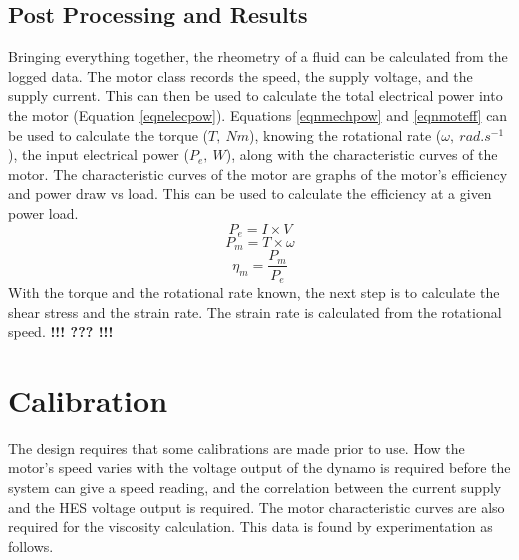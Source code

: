 \documentclass[twoside,a4]{report}
\def\cbh{\large\bfseries !!! ??? !!! \normalsize\normalfont}
\begin{document}
	\subsection*{Post Processing and Results} %
	Bringing everything together, the rheometry of a fluid can be calculated from the logged data. The motor class records the speed, the supply voltage, and the supply current. This can then be used to calculate the total electrical power into the motor (Equation \ref{eqnelecpow}). Equations \ref{eqnmechpow} and \ref{eqnmoteff} can be used to calculate the torque (\(T,\ Nm\)), knowing the rotational rate (\(\omega,\ rad.s^{-1}\)), the input electrical power (\(P_e,\ W\)), along with the characteristic curves of the motor. The characteristic curves of the motor are graphs of the motor's efficiency and power draw vs load. This can be used to calculate the efficiency at a given power load.
	\begin{equation}
		P_e = I \times V
		\label{eqnelecpow}
	\end{equation}
	\begin{equation}
		P_m = T \times \omega
		\label{eqnmechpow}
	\end{equation}
	\begin{equation}
		\eta_m = \frac{P_m}{P_e}
		\label{eqnmoteff}
	\end{equation}
	With the torque and the rotational rate known, the next step is to calculate the shear stress and the strain rate.
	The strain rate is calculated from the rotational speed. \cbh
	
	\section{Calibration} %
	The design requires that some calibrations are made prior to use. How the motor's speed varies with the voltage output of the dynamo is required before the system can give a speed reading, and the correlation between the current supply and the HES voltage output is required. The motor characteristic curves are also required for the viscosity calculation. This data is found by experimentation as follows.
	
\end{document}

